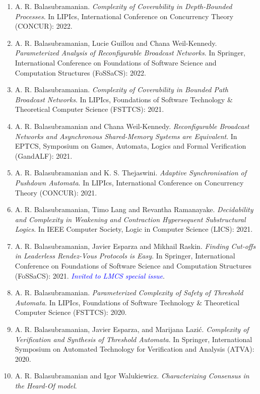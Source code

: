 \documentclass[11pt,a4paper,sans]{moderncv}        %
\begin{document}
\begin{enumerate}
	\textit{\textcolor{blue}{Invited to Fundamenta Infomaticae special issue}}.
	\item A. R. Balasubramanian.
	\textit{Complexity of Coverability in Depth-Bounded Processes}.
	In LIPIcs, International Conference on Concurrency Theory (CONCUR): 2022.
	\item A. R. Balasubramanian, Lucie Guillou and Chana Weil-Kennedy.
	\textit{Parameterized Analysis of Reconfigurable Broadcast Networks}.
	In Springer, International Conference on Foundations of Software Science and Computation Structures (FoSSaCS): 2022.
	\item A. R. Balasubramanian.
	\textit{Complexity of Coverability in Bounded Path Broadcast Networks}.
	In LIPIcs, Foundations of Software Technology \& Theoretical Computer Science (FSTTCS): 2021.
	\item A. R. Balasubramanian and Chana Weil-Kennedy.
	\textit{Reconfigurable Broadcast Networks and Asynchronous Shared-Memory Systems are Equivalent}.
	In EPTCS, Symposium on Games, Automata, Logics and Formal Verification (GandALF): 2021.
	\item A. R. Balasubramanian and K. S. Thejaswini.
	\textit{Adaptive Synchronisation of Pushdown Automata}.
	In LIPIcs, International Conference on Concurrency Theory (CONCUR): 2021.
	\item A. R. Balasubramanian, Timo Lang and Revantha Ramanayake.
	\textit{Decidability and Complexity in Weakening and Contraction Hypersequent Substructural Logics}.
	In IEEE Computer Society, Logic in Computer Science (LICS): 2021.
	\item A. R. Balasubramanian, Javier Esparza and Mikhail Raskin.
	\textit{Finding Cut-offs in Leaderless Rendez-Vous Protocols is Easy}.
	In Springer, International Conference on Foundations of Software Science and Computation Structures (FoSSaCS): 2021. \textit{\textcolor{blue}{Invited to LMCS special issue}}.
	\item A. R. Balasubramanian. \textit{Parameterized Complexity of Safety of Threshold Automata}.
	In LIPIcs, Foundations of Software Technology \& Theoretical Computer Science (FSTTCS): 2020.
	\item A. R. Balasubramanian, Javier Esparza, and Marijana Lazić.
	\textit{Complexity of Verification and Synthesis of Threshold Automata}.
	In Springer, International Symposium on Automated Technology for Verification and Analysis (ATVA): 2020.
	\item A. R. Balasubramanian and Igor Walukiewicz. \textit{Characterizing Consensus in the Heard-Of model}.

\end{enumerate}
\end{document}
